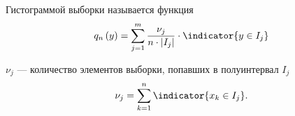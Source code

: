 \begin{comment}
Очевидно, что нас интересуют те пары, разность которых не равна нулю.
Это значит, что те случаи, когда $x>a_j$ или $x\le a_{j-1}$, нас не интересуют.
Поскольку такой случай, что $a_j<x\le a_{j-1}$ невозможен, то его тоже отбросим.
Значит, остался только тот вариант,
когда $x$ попадает в полуинтервал $\left(a_{j-1},a_j\right]$
$$\frac{1}{n}\cdot \sum_{k=1}^n
    \left[\indicator{x_k\le a_j}-\indicator{x_k\le a_{j-1}}\right]
  = \frac{1}{n}\cdot \sum_{k=1}^n \indicator{x_k\in \left(a_{j-1},a_j\right]}
$$

Видим знакомые полуинтервалы $\left(a_{j-1},a_j\right]=I_j$. Воспользуемся этим
$$\frac{1}{n}\cdot \sum_{k=1}^n \indicator{x_k\in \left(a_{j-1},a_j\right]}
= \frac{1}{n}\cdot \sum_{k=1}^n \indicator{x_k\in I_j}$$

Получаем компактную запись для разности функций распределения
\begin{equation}\label{eq:cdfn_difference_final}
\cdfn{a_j}-\cdfn{a_{j-1}}
= \frac{1}{n}\cdot \sum_{k=1}^n \indicator{x_k\in I_j}
\end{equation}


Вернёмся к уравнению \eqref{eq:histogram_start}
$$
q_n\left(y\right)
= \sum_{j=1}^m \frac{\cdfn{a_j}-\cdfn{a_{j-1}}}{a_j-a_{j-1}}
  \cdot\indicator{y\in I_j}
  $$

Воспользовавшись тем,
что $\left(a_j-a_{j-1}\right)$ --- длина полуинтервала $I_j$,
а разность $\cdfn{a_j}-\cdfn{a_{j-1}}$ была только что переписана
через индикаторы, получаем такую формулу
\begin{equation}\label{eq:histogramPreFinal}
  q_n\left(y\right)
    = \sum_{j=1}^m\frac{1}{n}\sum_{k=1}^n
      \indicator{x_k\in I_j}\cdot\frac{1}{\left|I_j\right|}
      \cdot \indicator{y \in I_j}
\end{equation}
\end{comment}
\begin{definition}[Гистограмма]
  Гистограммой выборки \xsample называется функция
  \begin{equation*}
    q_n\left(y\right)
    = \sum_{j=1}^m \frac{\nu_j}{n\cdot\left|I_j\right|}
      \cdot \indicator{y\in I_j}
  \end{equation*}
\end{definition}

$\nu_j$ --- количество элементов выборки, попавших в полуинтервал $I_j$
\begin{equation*}
  \nu_j = \sum_{k=1}^{n} \indicator{x_k \in I_j}.
\end{equation*}

